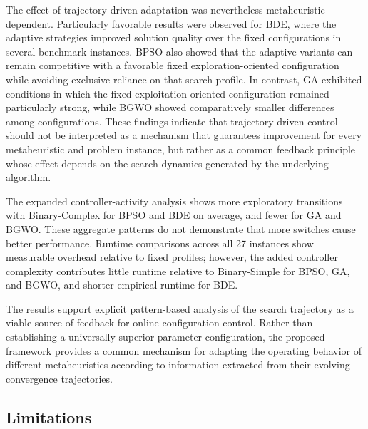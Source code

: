 \documentclass[journal,article,submit,moreauthors]{Definitions/mdpi}
\begin{document}
The effect of trajectory-driven adaptation was nevertheless
metaheuristic-dependent. Particularly favorable results were observed for
BDE, where the adaptive strategies improved solution quality over the fixed
configurations in several benchmark instances. BPSO also showed that the
adaptive variants can remain competitive with a favorable fixed
exploration-oriented configuration while avoiding exclusive reliance on
that search profile. In contrast, GA exhibited conditions in which the
fixed exploitation-oriented configuration remained particularly strong,
while BGWO showed comparatively smaller differences among configurations.
These findings indicate that trajectory-driven control should not be
interpreted as a mechanism that guarantees improvement for every
metaheuristic and problem instance, but rather as a common feedback
principle whose effect depends on the search dynamics generated by the
underlying algorithm.

The expanded controller-activity analysis shows more exploratory
transitions with Binary-Complex for BPSO and BDE on average, and fewer for
GA and BGWO. These aggregate patterns do not demonstrate that more
switches cause better performance. Runtime comparisons across all 27
instances show measurable overhead relative to fixed profiles; however,
the added controller complexity contributes little runtime relative to
Binary-Simple for BPSO, GA, and BGWO, and shorter empirical runtime for BDE.

The results support explicit pattern-based analysis of the search
trajectory as a viable source of feedback for online configuration control.
Rather than establishing a universally superior parameter configuration,
the proposed framework provides a common mechanism for adapting the
operating behavior of different metaheuristics according to information
extracted from their evolving convergence trajectories.


\subsection{Limitations}
\label{subsec:limitations}
\end{document}
